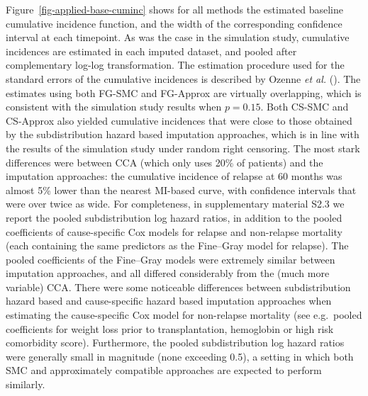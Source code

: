 \documentclass[
  letterpaper,
  DIV=11,
  numbers=noendperiod]{scrreprt}
\begin{document}
Figure~\ref{fig-applied-base-cuminc} shows for all methods the estimated
baseline cumulative incidence function, and the width of the
corresponding confidence interval at each timepoint. As was the case in
the simulation study, cumulative incidences are estimated in each
imputed dataset, and pooled after complementary log-log transformation.
The estimation procedure used for the standard errors of the cumulative
incidences is described by Ozenne \emph{et al.}
(). The estimates using both FG-SMC and
FG-Approx are virtually overlapping, which is consistent with the
simulation study results when \(p = 0.15\). Both CS-SMC and CS-Approx
also yielded cumulative incidences that were close to those obtained by
the subdistribution hazard based imputation approaches, which is in line
with the results of the simulation study under random right censoring.
The most stark differences were between CCA (which only uses 20\% of
patients) and the imputation approaches: the cumulative incidence of
relapse at 60 months was almost 5\% lower than the nearest MI-based
curve, with confidence intervals that were over twice as wide. For
completeness, in supplementary material S2.3 we report the pooled
subdistribution log hazard ratios, in addition to the pooled
coefficients of cause-specific Cox models for relapse and non-relapse
mortality (each containing the same predictors as the Fine--Gray model
for relapse). The pooled coefficients of the Fine--Gray models were
extremely similar between imputation approaches, and all differed
considerably from the (much more variable) CCA. There were some
noticeable differences between subdistribution hazard based and
cause-specific hazard based imputation approaches when estimating the
cause-specific Cox model for non-relapse mortality (see e.g.~pooled
coefficients for weight loss prior to transplantation, hemoglobin or
high risk comorbidity score). Furthermore, the pooled subdistribution
log hazard ratios were generally small in magnitude (none exceeding
0.5), a setting in which both SMC and approximately compatible
approaches are expected to perform similarly.
\end{document}
